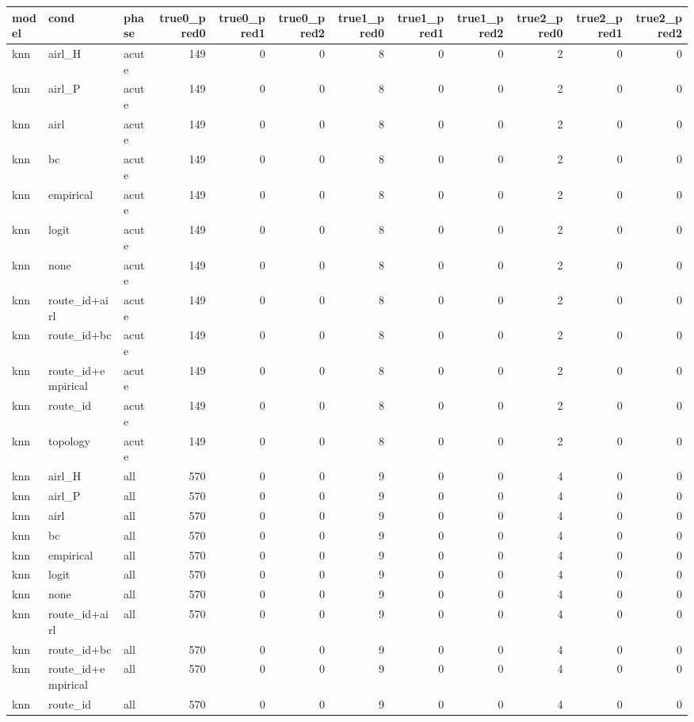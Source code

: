 \begin{tabular}{lllrrrrrrrrr}
\toprule
model & cond & phase & true0_pred0 & true0_pred1 & true0_pred2 & true1_pred0 & true1_pred1 & true1_pred2 & true2_pred0 & true2_pred1 & true2_pred2 \\
\midrule
knn & airl_H & acute & 149 & 0 & 0 & 8 & 0 & 0 & 2 & 0 & 0 \\
knn & airl_P & acute & 149 & 0 & 0 & 8 & 0 & 0 & 2 & 0 & 0 \\
knn & airl & acute & 149 & 0 & 0 & 8 & 0 & 0 & 2 & 0 & 0 \\
knn & bc & acute & 149 & 0 & 0 & 8 & 0 & 0 & 2 & 0 & 0 \\
knn & empirical & acute & 149 & 0 & 0 & 8 & 0 & 0 & 2 & 0 & 0 \\
knn & logit & acute & 149 & 0 & 0 & 8 & 0 & 0 & 2 & 0 & 0 \\
knn & none & acute & 149 & 0 & 0 & 8 & 0 & 0 & 2 & 0 & 0 \\
knn & route_id+airl & acute & 149 & 0 & 0 & 8 & 0 & 0 & 2 & 0 & 0 \\
knn & route_id+bc & acute & 149 & 0 & 0 & 8 & 0 & 0 & 2 & 0 & 0 \\
knn & route_id+empirical & acute & 149 & 0 & 0 & 8 & 0 & 0 & 2 & 0 & 0 \\
knn & route_id & acute & 149 & 0 & 0 & 8 & 0 & 0 & 2 & 0 & 0 \\
knn & topology & acute & 149 & 0 & 0 & 8 & 0 & 0 & 2 & 0 & 0 \\
knn & airl_H & all & 570 & 0 & 0 & 9 & 0 & 0 & 4 & 0 & 0 \\
knn & airl_P & all & 570 & 0 & 0 & 9 & 0 & 0 & 4 & 0 & 0 \\
knn & airl & all & 570 & 0 & 0 & 9 & 0 & 0 & 4 & 0 & 0 \\
knn & bc & all & 570 & 0 & 0 & 9 & 0 & 0 & 4 & 0 & 0 \\
knn & empirical & all & 570 & 0 & 0 & 9 & 0 & 0 & 4 & 0 & 0 \\
knn & logit & all & 570 & 0 & 0 & 9 & 0 & 0 & 4 & 0 & 0 \\
knn & none & all & 570 & 0 & 0 & 9 & 0 & 0 & 4 & 0 & 0 \\
knn & route_id+airl & all & 570 & 0 & 0 & 9 & 0 & 0 & 4 & 0 & 0 \\
knn & route_id+bc & all & 570 & 0 & 0 & 9 & 0 & 0 & 4 & 0 & 0 \\
knn & route_id+empirical & all & 570 & 0 & 0 & 9 & 0 & 0 & 4 & 0 & 0 \\
knn & route_id & all & 570 & 0 & 0 & 9 & 0 & 0 & 4 & 0 & 0 \\

\end{tabular}
